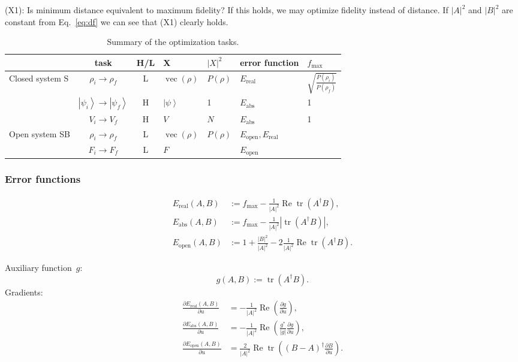 \documentclass[aps, pra, a4paper, longbibliography]{revtex4}
\newcommand{\be}{\begin{equation}}
\newcommand{\ee}{\end{equation}}
\newcommand{\ket}[1]{\left| #1 \right \rangle}
\DeclareMathOperator{\tr}{tr}
\DeclareMathOperator{\re}{Re}
\DeclareMathOperator{\cvec}{vec}
\newcommand{\dd}[2]{\frac{\partial #1}{\partial #2}}
\begin{document}
(X1): Is minimum distance equivalent to maximum fidelity?
If this holds, we may optimize fidelity instead of distance.
If $|A|^2$ and $|B|^2$ are constant
from Eq.~\eqref{eq:df} we can see that (X1) clearly holds.






\begin{table}
\begin{tabular}{l|c|c|l|l|l|l}
& task & H/L & X & $|X|^2$ & error function & $f_\text{max}$\\
\hline
Closed system S
& $\rho_i \to \rho_f$ & L & $\cvec(\rho)$ & $P(\rho)$
& $E_\text{real}$ & $\sqrt{\frac{P(\rho_i)}{P(\rho_f)}}$\\
& $\ket{\psi_i} \to \ket{\psi_f}$ & H & $\ket{\psi}$ & 1 &
$E_\text{abs}$ & 1\\
& $V_i \to V_f$ & H & $V$ & $N$ & $E_\text{abs}$ & 1\\
\hline
Open system SB
& $\rho_i \to \rho_f$ & L & $\cvec(\rho)$ & $P(\rho)$ &
$E_\text{open}, E_\text{real}$\\
& $F_i \to F_f$ & L & $F$ &  & $E_\text{open}$\\
\end{tabular}
\caption{Summary of the optimization tasks.}
\label{table:tasks}
\end{table}


\subsubsection{Error functions}

\begin{align}
E_\text{real}(A, B) &:= f_\text{max} -\frac{1}{|A|^2} \re \tr(A^\dagger B),\\
E_\text{abs}(A, B) &:= f_\text{max} -\frac{1}{|A|^2} |\tr(A^\dagger B)|,\\
E_\text{open}(A, B) &:= 1 +\frac{|B|^2}{|A|^2} -2 \frac{1}{|A|^2} \re \tr(A^\dagger B).
\end{align}


Auxiliary function~$g$:
\be
g(A, B) := \tr(A^\dagger B).
\ee
Gradients:
\begin{align}
\dd{E_\text{real}(A,B)}{u}
&= -\frac{1}{|A|^2} \re \left( \dd{g}{u} \right),\\
\dd{E_\text{abs}(A,B)}{u}
&= -\frac{1}{|A|^2} \re \left(\frac{g^*}{|g|} \dd{g}{u} \right),\\
\dd{E_\text{open}(A, B)}{u}
&= \frac{2}{|A|^2} \re \tr\left((B-A)^\dagger \dd{B}{u}\right).
\end{align}
\end{document}
